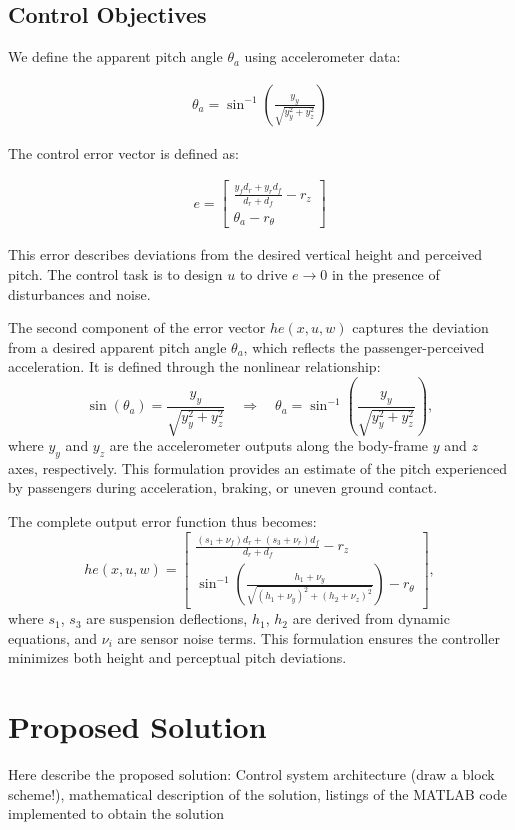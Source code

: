 \documentclass[]{report}
\begin{document}
\subsection{Control Objectives}

We define the apparent pitch angle $\theta_a$ using accelerometer data:

\begin{align}
	\theta_a = \sin^{-1} \left( \frac{y_y}{\sqrt{y_y^2 + y_z^2}} \right)
\end{align}

The control error vector is defined as:

\begin{align}
	e = \begin{bmatrix}
		\frac{y_f d_r + y_r d_f}{d_r + d_f} - r_z \\
		\theta_a - r_\theta
	\end{bmatrix}
\end{align}

This error describes deviations from the desired vertical height and perceived pitch. The control task is to design $u$ to drive $e \rightarrow 0$ in the presence of disturbances and noise.

The second component of the error vector $he(x,u,w)$ captures the deviation from a desired apparent pitch angle $\theta_a$, which reflects the passenger-perceived acceleration. It is defined through the nonlinear relationship:
\[
\sin(\theta_a) = \frac{y_y}{\sqrt{y_y^2 + y_z^2}} \quad \Rightarrow \quad \theta_a = \sin^{-1}\left(\frac{y_y}{\sqrt{y_y^2 + y_z^2}}\right),
\]
where $y_y$ and $y_z$ are the accelerometer outputs along the body-frame $y$ and $z$ axes, respectively. This formulation provides an estimate of the pitch experienced by passengers during acceleration, braking, or uneven ground contact.


The complete output error function thus becomes:
\[
he(x, u, w) =
\begin{bmatrix}
	\displaystyle \frac{(s_1 + \nu_f) d_r + (s_3 + \nu_r) d_f}{d_r + d_f} - r_z \\
	\displaystyle \sin^{-1}\left( \frac{h_1 + \nu_y}{\sqrt{(h_1 + \nu_y)^2 + (h_2 + \nu_z)^2}} \right) - r_\theta
\end{bmatrix},
\]
where $s_1$, $s_3$ are suspension deflections, $h_1$, $h_2$ are derived from dynamic equations, and $\nu_i$ are sensor noise terms. This formulation ensures the controller minimizes both height and perceptual pitch deviations.

\section{Proposed Solution}
Here describe the proposed solution: Control system architecture (draw a block scheme!), mathematical description of the solution, listings of the MATLAB code implemented to obtain the solution
\end{document}
